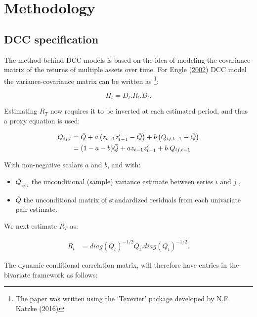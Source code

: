 \documentclass[11pt,preprint, authoryear]{elsarticle}
\numberwithin{equation}{section}
\numberwithin{figure}{section}
\numberwithin{table}{section}
\let\rmarkdownfootnote\footnote%
\def\footnote{\protect\rmarkdownfootnote}
\begin{document}
\hypertarget{methodology}{%
\section{Methodology}\label{methodology}}

\hypertarget{dcc-specification}{%
\subsection{DCC specification}\label{dcc-specification}}

The method behind DCC models is based on the idea of modeling the
covariance matrix of the returns of multiple assets over time. For Engle
(\protect\hyperlink{ref-engle2002dynamic}{2002}) DCC model the
variance-covariance matrix can be written as \footnote{The paper was
  written using the `Texevier' package developed by N.F. Katzke (2016)}:

\begin{equation} \label{dcc}
H_t = D_t.R_t.D_t.
\end{equation}

Estimating \(R_T\) now requires it to be inverted at each estimated
period, and thus a proxy equation is used:

\begin{align}  \label{dcc2}
  Q_{ij,t} &= \bar Q + a\left(z_{t - 1}z'_{t - 1} - \bar{Q} \right) + b\left( Q_{ij, t - 1} - \bar{Q} \right) \hfill \\ \notag
        &= (1 - a - b)\bar{Q} + az_{t - 1}z'_{t - 1} + b.Q_{ij, t - 1} \notag
\end{align}

With non-negative scalars \(a\) and \(b\), and with:

\begin{itemize}
\item
  \(Q_{ij, t}\) the unconditional (sample) variance estimate between
  series \(i\) and \(j\) ,
\item
  \(\bar{Q}\) the unconditional matrix of standardized residuals from
  each univariate pair estimate.
\end{itemize}

We next estimate \(R_T\) as:

\begin{align}\label{eq:dcc3}
R_t &= diag(Q_t)^{-1/2}Q_t.diag(Q_t)^{-1/2}. 
\end{align}

The dynamic conditional correlation matrix, will therefore have entries
in the bivariate framework as follows:
\end{document}
